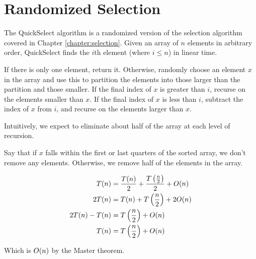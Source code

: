 \chapter{Randomized Selection}

The QuickSelect algorithm is a randomized version of the selection
algorithm covered in Chapter \ref{chapter:selection}.  Given an array
of $n$ elements in arbitrary order, QuickSelect finds the $i$th
element (where $i \le n$) in linear time.

If there is only one element, return it.  Otherwise, randomly choose
an element $x$ in the array and use this to partition the elements
into those larger than the partition and those smaller.  If the final
index of $x$ is greater than $i$, recurse on the elements smaller than
$x$.  If the final index of $x$ is less than $i$, subtract the index
of $x$ from $i$, and recurse on the elements larger than $x$.

Intuitively, we expect to eliminate about half of the array at each
level of recursion.

Say that if $x$ falls within the first or last quarters of the sorted
array, we don't remove any elements.  Otherwise, we remove half of the
elements in the array.

\begin{align*}
  T(n)
  &= \frac{T(n)}{2} + \frac{T \left( \frac{n}{2} \right)}{2} + O\!\left(n\right) \\
  2 T(n) &= T(n) + T \left( \frac{n}{2} \right) + 2 O\!\left(n\right) \\
  2 T(n) - T(n) &= T \left( \frac{n}{2} \right) + O\!\left(n\right) \\
  T(n) &= T \left( \frac{n}{2} \right) + O\!\left(n\right) \\
\end{align*}

Which is $O\!\left(n\right)$ by the Master theorem.
